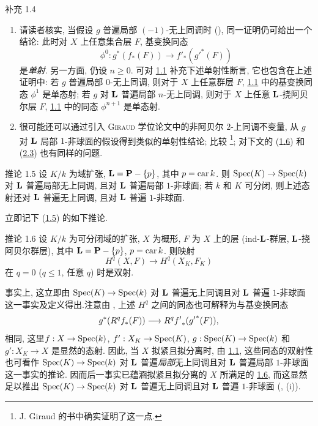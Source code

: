 \begin{enonce*}[remark]{补充 1.4}
\begin{enumerate}
\renewcommand{\theenumi}{\alph{enumi}}
\renewcommand{\labelenumi}{\theenumi)}
\item 请读者核实, 当假设 $g$ 普遍局部 $(-1)$-无上同调时 (), 同一证明仍可给出一个结论: 此时对 $X$ 上任意集合层 $F$, 基变换同态
$$
\phi^{0}:g^{\ast}(f_{\ast}(F))\longrightarrow f'_{\ast}({g'}^{\ast}(F))
$$
是\emph{单射}. 另一方面, 仍设 $n\geq 0$. 可对 \hyperref[XVI.thm1.1]{1.1} 补充下述单射性断言, 它也包含在上述证明中: 若 $g$ 普遍局部 $0$-无上同调, 则对于 $X$ 上任意群层 $F$, \hyperref[XVI.thm1.1]{1.1} 中的基变换同态 $\phi^{1}$ 是单态射; 若 $g$ 对 $\mathbf{L}$ 普遍局部 $n$-无上同调, 则对于 $X$ 上任意 $\mathbf{L}$-挠阿贝尔层 $F$, \hyperref[XVI.thm1.1]{1.1} 中的同态 $\phi^{n+1}$ 是单态射.

\item 很可能还可以通过引入 \textsc{Giraud} 学位论文中的非阿贝尔 $2$-上同调不变量, 从 $g$ 对 $\mathbf{L}$ 局部 $1$-非球面的假设得到类似的单射性结论\pageoriginale; 比较 \footnote[1]{J. Giraud 的书中确实证明了这一点.}; 对下文的 (\hyperref[XVI.cor1.6]{1.6}) 和 (\hyperref[XVI.cor2.3]{2.3}) 也有同样的问题.
\end{enumerate}
\end{enonce*}

\begin{enonce*}{推论 1.5}
设 $K/k$ 为域扩张, $\mathbf{L}=\mathbf{P}-\{p\}$, 其中 $p= \operatorname{car} k$. 则 $\operatorname{Spec}(K)\rightarrow \operatorname{Spec}(k)$ 对 $\mathbf{L}$ 普遍局部无上同调, 且对 $\mathbf{L}$ 普遍局部 $1$-非球面; 若 $k$ 和 $K$ 可分闭, 则上述态射还对 $\mathbf{L}$ 普遍无上同调, 且对 $\mathbf{L}$ 普遍 $1$-非球面.
\end{enonce*}

立即记下 (\hyperref[XVI.cor1.5]{1.5}) 的如下推论.

\begin{enonce*}{推论 1.6}
设 $K/k$ 为可分闭域的扩张, $X$ 为概形, $F$ 为 $X$ 上的层 (\resp ind-$\mathbf{L}$-群层, \resp $\mathbf{L}$-挠阿贝尔群层), 其中 $\mathbf{L}=\mathbf{P}-\{p\}$, $p=\operatorname{car} k$. 则映射
$$
H^{q}(X,F)\longrightarrow H^{q}(X_{K},F_{K})
$$
在 $q=0$ (\resp $q\leq 1$, \resp 任意 $q$) 时是双射.
\end{enonce*}

事实上, 这立即由 $\operatorname{Spec}(K)\rightarrow \operatorname{Spec}(k)$ 对 $\mathbf{L}$ 普遍无上同调且对 $\mathbf{L}$ 普遍 $1$-非球面这一事实及定义得出.\sisi{---~}{~}注意由 , 上述 $H^{q}$ 之间的同态也可解释为与基变换同态
$$
g^{\ast}(R^{q}f_{\ast}(F))\longrightarrow
R^{q}{f'}_{\ast}({g'}^{\ast}(F)){},
$$
相同, 这里\pageoriginale $f:X\rightarrow \operatorname{Spec}(k)$, $f':X_K\rightarrow \operatorname{Spec}(K)$, $g:\operatorname{Spec}(K)\rightarrow \operatorname{Spec}(k)$ 和 $g':X_K\rightarrow X$ 是显然的态射. 因此, 当 $X$ 拟紧且拟分离时, 由 \hyperref[XVI.thm1.1]{1.1}, 这些同态的双射性也可看作 $\operatorname{Spec}(K)\rightarrow \operatorname{Spec}(k)$ 对 $\mathbf{L}$ 普遍\emph{局部}无上同调且对 $\mathbf{L}$ 普遍局部 $1$-非球面这一事实的推论. 因而后一事实已蕴涵拟紧且拟分离的 $X$ 所满足的 \hyperref[XVI.cor1.6]{1.6}, 而这显然足以推出 $\operatorname{Spec}(K)\rightarrow \operatorname{Spec}(k)$ 对 $\mathbf{L}$ 普遍无上同调且对 $\mathbf{L}$ 普遍 $1$-非球面 (,  (i)).

